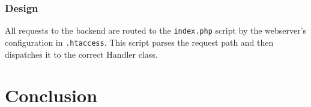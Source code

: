 \documentclass[12pt]{amsart}
\begin{document}
  \subsubsection{Design}
    \begin{flushleft}
      All requests to the backend are routed to the \verb|index.php| script by the webserver's configuration in \verb|.htaccess|.
      This script parses the request path and then dispatches it to the correct Handler class.
    \end{flushleft}
\section{Conclusion}
\end{document}
